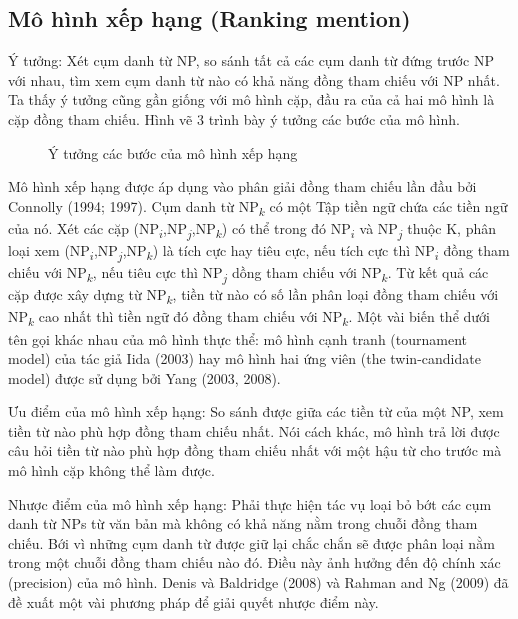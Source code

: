\documentclass[12pt]{report}
\begin{document}
			\subsection*{Mô hình xếp hạng (Ranking mention)}
				\par Ý tưởng: Xét cụm danh từ NP, so sánh tất cả các cụm danh từ đứng trước NP với nhau, tìm xem cụm danh từ nào có khả năng đồng tham chiếu với NP nhất. Ta thấy ý tưởng cũng gần giống với mô hình cặp, đầu ra của cả hai mô hình là cặp đồng tham chiếu. Hình vẽ 3 trình bày ý tưởng các bước của mô hình.
				\begin{figure}[H]
					\centering
					
					\caption{Ý tưởng các bước của mô hình xếp hạng}
				\end{figure}
				\par Mô hình xếp hạng được áp dụng vào phân giải đồng tham chiếu lần đầu bởi Connolly (1994; 1997)\cite{connolly95}\cite{connolly97}. Cụm danh từ NP\textsubscript{$k$} có một Tập tiền ngữ chứa các tiền ngữ của nó. Xét các cặp (NP\textsubscript{$i$},NP\textsubscript{$j$},NP\textsubscript{$k$}) có thể trong đó NP\textsubscript{$i$} và NP\textsubscript{$j$} thuộc K, phân loại xem (NP\textsubscript{$i$},NP\textsubscript{$j$},NP\textsubscript{$k$}) là tích cực hay tiêu cực, nếu tích cực thì NP\textsubscript{$i$} đồng tham chiếu với NP\textsubscript{$k$}, nếu tiêu cực thì NP\textsubscript{$j$} dồng tham chiếu với NP\textsubscript{$k$}. Từ kết quả các cặp được xây dựng từ NP\textsubscript{$k$}, tiền từ nào có số lần phân loại đồng tham chiếu với NP\textsubscript{$k$} cao nhất thì tiền ngữ đó đồng tham chiếu với NP\textsubscript{$k$}.
				Một vài biến thể dưới tên gọi khác nhau của mô hình thực thể: mô hình cạnh tranh (tournament model) của tác giả Iida (2003)\cite{iida03} hay mô hình hai ứng viên (the twin-candidate model) được sử dụng bởi Yang (2003, 2008)\cite{yang03}\cite{yang08}. 
				\par Ưu điểm của mô hình xếp hạng: So sánh được giữa các tiền từ của một NP, xem tiền từ nào phù hợp đồng tham chiếu nhất. Nói cách khác, mô hình trả lời được câu hỏi tiền từ nào phù hợp đồng tham chiếu nhất với một hậu từ cho trước mà mô hình cặp không thể làm được.
				\par Nhược điểm của mô hình xếp hạng: Phải thực hiện tác vụ loại bỏ bớt các cụm danh từ NPs từ văn bản mà không có khả năng nằm trong chuỗi đồng tham chiếu. Bới vì những cụm danh từ được giữ lại chắc chắn sẽ được phân loại nằm trong một chuỗi đồng tham chiếu nào đó. Điều này ảnh hưởng đến độ chính xác (precision)  của mô hình. Denis và Baldridge (2008)\cite{denis08} và Rahman and Ng (2009)\cite{rahman09} đã đề xuất một vài phương pháp để giải quyết nhược điểm này.					
\end{document}
